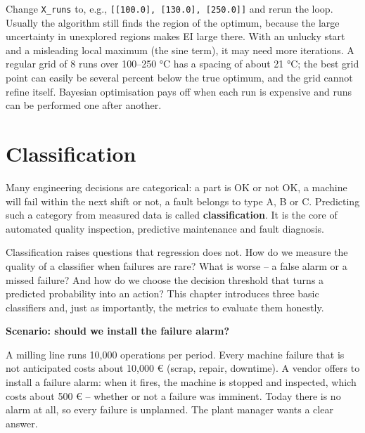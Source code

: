 \documentclass[
  letterpaper,
  DIV=11,
  numbers=noendperiod]{scrreprt}
\begin{document}
\begin{tcolorbox}[enhanced jigsaw, left=2mm, title=\textcolor{quarto-callout-caution-color}{\faFire}\hspace{0.5em}{Solution to Exercise 7}, opacityback=0, breakable, rightrule=.15mm, arc=.35mm, toptitle=1mm, colbacktitle=quarto-callout-caution-color!10!white, opacitybacktitle=0.6, coltitle=black, colframe=quarto-callout-caution-color-frame, bottomrule=.15mm, leftrule=.75mm, bottomtitle=1mm, titlerule=0mm, toprule=.15mm, colback=white]

Change \texttt{X\_runs} to, e.g.,
\texttt{{[}{[}100.0{]},\ {[}130.0{]},\ {[}250.0{]}{]}} and rerun the
loop. Usually the algorithm still finds the region of the optimum,
because the large uncertainty in unexplored regions makes EI large
there. With an unlucky start and a misleading local maximum (the sine
term), it may need more iterations. A regular grid of 8 runs over
100--250 °C has a spacing of about 21 °C; the best grid point can easily
be several percent below the true optimum, and the grid cannot refine
itself. Bayesian optimisation pays off when each run is expensive and
runs can be performed one after another.

\end{tcolorbox}

\chapter{Classification}\label{classification}

Many engineering decisions are categorical: a part is OK or not OK, a
machine will fail within the next shift or not, a fault belongs to type
A, B or C. Predicting such a category from measured data is called
\textbf{classification}. It is the core of automated quality inspection,
predictive maintenance and fault diagnosis.

Classification raises questions that regression does not. How do we
measure the quality of a classifier when failures are rare? What is
worse -- a false alarm or a missed failure? And how do we choose the
decision threshold that turns a predicted probability into an action?
This chapter introduces three basic classifiers and, just as
importantly, the metrics to evaluate them honestly.

\textbf{Scenario: should we install the failure alarm?}

A milling line runs 10,000 operations per period. Every machine failure
that is not anticipated costs about 10,000 € (scrap, repair, downtime).
A vendor offers to install a failure alarm: when it fires, the machine
is stopped and inspected, which costs about 500 € -- whether or not a
failure was imminent. Today there is no alarm at all, so every failure
is unplanned. The plant manager wants a clear answer.
\end{document}
